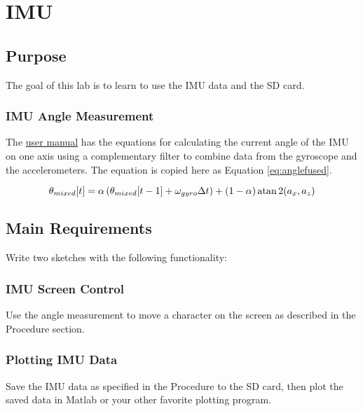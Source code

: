 \chapter{IMU}

\section{Purpose}
The goal of this lab is to learn to use the IMU data and the SD card.

\subsection{IMU Angle Measurement\label{subsec:imuangle}}
The \href{https://semcneil.github.io/Fundamentals-of-Microcontrollers-Manual/Fundamentals-of-Microcontrollers.pdf}{user manual} 
has the equations for calculating the current angle of the IMU on one axis
using a complementary filter to combine data from the gyroscope and the accelerometers. The 
equation is copied here as Equation \ref{eq:anglefused}. 

\begin{equation}
    \label{eq:anglefused}
    \theta_{mixed}[t] = \alpha \left(\theta_{mixed}[t-1] + \omega_{gyro}\Delta t \right) + (1-\alpha)\atan2(a_x,a_z)
\end{equation}

\section{Main Requirements}
Write two sketches with the following functionality:

\subsection{IMU Screen Control}
Use the angle measurement to move a character on the screen as described in the Procedure section.

\subsection{Plotting IMU Data}
Save the IMU data as specified in the Procedure to the SD card, then plot the saved data in Matlab 
or your other favorite plotting program.

